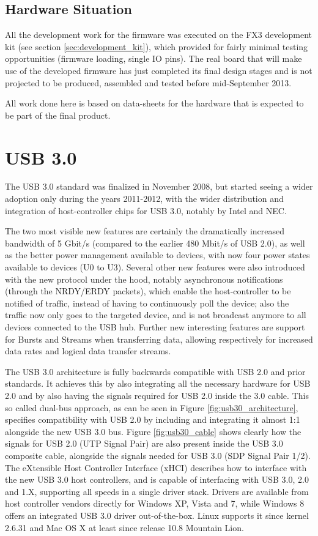 \documentclass[a4paper,12pt]{report}
\begin{document}
\section{Hardware Situation} \label{sec:hardware_situation}

All the development work for the firmware was executed on the FX3 development kit (see section \ref{sec:development_kit}), which provided for fairly minimal testing opportunities (firmware loading, single IO pins). The real board that will make use of the developed firmware has just completed its final design stages and is not projected to be produced, assembled and tested before mid-September 2013.

All work done here is based on data-sheets for the hardware that is expected to be part of the final product.

\chapter{USB 3.0} \label{chap:usb_3.0}

The USB 3.0 standard was finalized in November 2008, but started seeing a wider adoption only during the years 2011-2012, with the wider distribution and integration of host-controller chips for USB 3.0, notably by Intel and NEC.

The two most visible new features are certainly the dramatically increased bandwidth of 5 Gbit/s (compared to the earlier 480 Mbit/s of USB 2.0), as well as the better power management available to devices, with now four power states available to devices (U0 to U3).
Several other new features were also introduced with the new protocol under the hood, notably asynchronous notifications (through the NRDY/ERDY packets), which enable the host-controller to be notified of traffic, instead of having to continuously poll the device; also the traffic now only goes to the targeted device, and is not broadcast anymore to all devices connected to the USB hub.
Further new interesting features are support for Bursts and Streams when transferring data, allowing respectively for increased data rates and logical data transfer streams.

The USB 3.0 architecture is fully backwards compatible with USB 2.0 and prior standards. It achieves this by also integrating all the necessary hardware for USB 2.0 and by also having the signals required for USB 2.0 inside the 3.0 cable. This so called dual-bus approach, as can be seen in Figure \ref{fig:usb30_architecture}, specifies compatibility with USB 2.0 by including and integrating it almost 1:1 alongside the new USB 3.0 bus.
Figure \ref{fig:usb30_cable} shows clearly how the signals for USB 2.0 (UTP Signal Pair) are also present inside the USB 3.0 composite cable, alongside the signals needed for USB 3.0 (SDP Signal Pair 1/2).
The eXtensible Host Controller Interface (xHCI) describes how to interface with the new USB 3.0 host controllers, and is capable of interfacing with USB 3.0, 2.0 and 1.X, supporting all speeds in a single driver stack. Drivers are available from host controller vendors directly for Windows XP, Vista and 7, while Windows 8 offers an integrated USB 3.0 driver out-of-the-box. Linux supports it since kernel 2.6.31 and Mac OS X at least since release 10.8 Mountain Lion.
\end{document}
